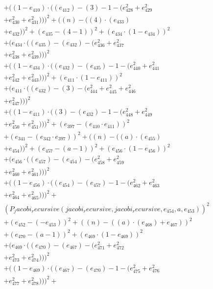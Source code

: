 \documentclass[10pt, a4paper]{article}
\begin{document}
\begin{align*}
& + ((1 - e_{410})  \cdot  ((e_{412}) - (3) - 1 - (e_{428}^{2} + e_{429}^{2} \\
& + e_{430}^{2} + e_{431}^{2})))^{2} + ((n) - ((4)  \cdot  (e_{433}) \\
& + e_{432}))^{2} + (e_{435} - (4 - 1))^{2} + (e_{434}  \cdot  (1 - e_{434}))^{2} \\
& + (e_{434}  \cdot  ((e_{435}) - (e_{432}) - (e_{436}^{2} + e_{437}^{2} \\
& + e_{438}^{2} + e_{439}^{2})))^{2} \\
& + ((1 - e_{434})  \cdot  ((e_{432}) - (e_{435}) - 1 - (e_{440}^{2} + e_{441}^{2} \\
& + e_{442}^{2} + e_{443}^{2})))^{2} + (e_{411}  \cdot  (1 - e_{411}))^{2} \\
& + (e_{411}  \cdot  ((e_{432}) - (3) - (e_{444}^{2} + e_{445}^{2} + e_{446}^{2} \\
& + e_{447}^{2})))^{2} \\
& + ((1 - e_{411})  \cdot  ((3) - (e_{432}) - 1 - (e_{448}^{2} + e_{449}^{2} \\
& + e_{450}^{2} + e_{451}^{2})))^{2} + (e_{397} - (e_{410}  \cdot  e_{411}))^{2} \\
& + (e_{341} - (e_{342}  \cdot  e_{397}))^{2} + ((n) - ((a)  \cdot  (e_{455}) \\
& + e_{454}))^{2} + (e_{457} - (a - 1))^{2} + (e_{456}  \cdot  (1 - e_{456}))^{2} \\
& + (e_{456}  \cdot  ((e_{457}) - (e_{454}) - (e_{458}^{2} + e_{459}^{2} \\
& + e_{460}^{2} + e_{461}^{2})))^{2} \\
& + ((1 - e_{456})  \cdot  ((e_{454}) - (e_{457}) - 1 - (e_{462}^{2} + e_{463}^{2} \\
& + e_{464}^{2} + e_{465}^{2})))^{2} + \\
& (P_jacobi_recursive(jacobi_recursive, jacobi_recursive, e_{454}, a, e_{453}))^{2} \\
& + (e_{452} - (-e_{453}))^{2} + ((n) - ((a)  \cdot  (e_{468}) + e_{467}))^{2} \\
& + (e_{470} - (a - 1))^{2} + (e_{469}  \cdot  (1 - e_{469}))^{2} \\
& + (e_{469}  \cdot  ((e_{470}) - (e_{467}) - (e_{471}^{2} + e_{472}^{2} \\
& + e_{473}^{2} + e_{474}^{2})))^{2} \\
& + ((1 - e_{469})  \cdot  ((e_{467}) - (e_{470}) - 1 - (e_{475}^{2} + e_{476}^{2} \\
& + e_{477}^{2} + e_{478}^{2})))^{2} + \\

\end{align*}
\end{document}

